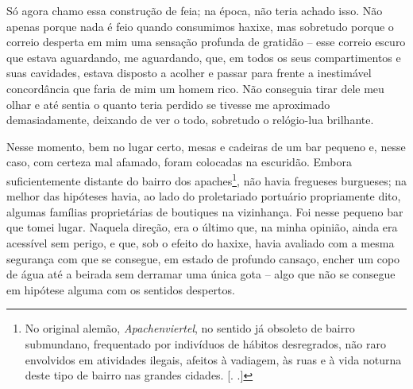 Só agora chamo essa construção de feia; na época, não teria achado isso.
Não apenas porque nada é feio quando consumimos haxixe, mas sobretudo
porque o correio desperta em mim uma sensação profunda de gratidão --
esse correio escuro que estava aguardando, me aguardando, que, em todos
os seus compartimentos e suas cavidades, estava disposto a acolher e
passar para frente a inestimável concordância que faria de mim um homem
rico. Não conseguia tirar dele meu olhar e até sentia o quanto teria
perdido se tivesse me aproximado demasiadamente, deixando de ver o todo,
sobretudo o relógio-lua brilhante.

Nesse momento, bem no lugar certo, mesas e cadeiras de um bar pequeno e,
nesse caso, com certeza mal afamado, foram colocadas na escuridão.
Embora suficientemente distante do bairro dos apaches\footnote{No
  original alemão, \emph{Apachenviertel}, no sentido já obsoleto de
  bairro submundano, frequentado por indivíduos de hábitos desregrados,
  não raro envolvidos em atividades ilegais, afeitos à vadiagem, às ruas
  e à vida noturna deste tipo de bairro nas grandes cidades. [. .]}, não havia
fregueses burgueses; na melhor das hipóteses havia, ao lado do
proletariado portuário propriamente dito, algumas famílias proprietárias
de boutiques na vizinhança. Foi nesse pequeno bar que tomei lugar.
Naquela direção, era o último que, na minha opinião, ainda era acessível
sem perigo, e que, sob o efeito do haxixe, havia avaliado com a mesma
segurança com que se consegue, em estado de profundo cansaço, encher um
copo de água até a beirada sem derramar uma única gota -- algo que não
se consegue em hipótese alguma com os sentidos despertos.

